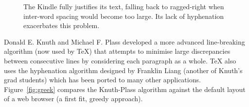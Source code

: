 \begin{figure}
    \centering
    \caption[Poor typography on the Kindle]{The Kindle fully justifies its text, falling back to ragged-right when inter-word spacing would become too large. Its lack of hyphenation exacerbates this problem.}
    \label{fig:crapkindle}
\end{figure}

Donald E. Knuth and Michael F. Plass\hspace{0pt}\cite{Knuth1981} developed a more advanced line-breaking algorithm (now used by \TeX{}) that attempts to minimise large discrepancies between consecutive lines by considering each paragraph as a whole. \TeX{} also uses the hyphenation algorithm designed by Franklin Liang\hspace{0pt}\cite{Liang1983} (another of Knuth's grad students) which has been ported to many other applications. Figure~\ref{fig:greek} compares the Knuth-Plass algorithm against the default layout of a web browser (a first fit, greedy approach).


